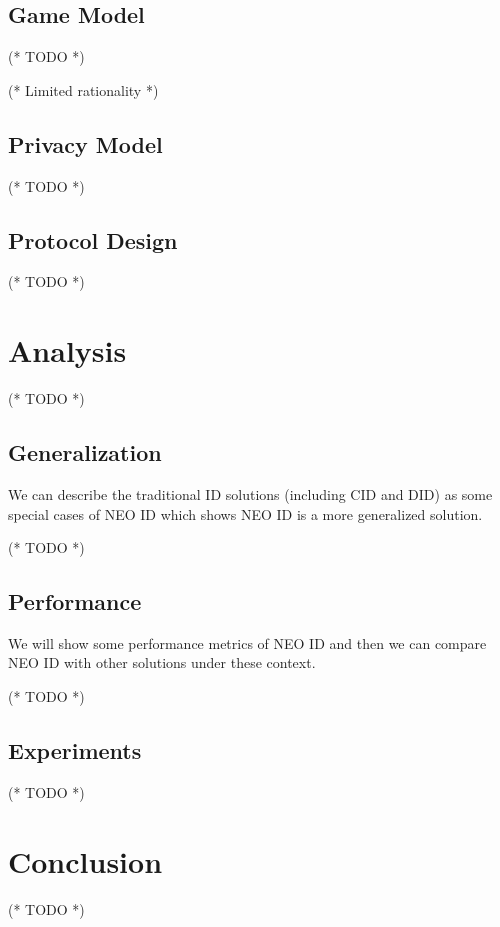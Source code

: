 \documentclass{article}
\begin{document}
\subsection{Game Model}



(* TODO *)



(* Limited rationality *)


\subsection{Privacy Model}



(* TODO *)


\subsection{Protocol Design}



(* TODO *)


\section{Analysis}



(* TODO *)


\subsection{Generalization}



We can describe the traditional ID solutions (including CID and DID) as some special cases of NEO ID which shows NEO ID is a more generalized solution.



(* TODO *)


\subsection{Performance}



We will show some performance metrics of NEO ID and then we can compare NEO ID with other solutions under these context.



(* TODO *)


\subsection{Experiments}



(* TODO *)


\section{Conclusion}



(* TODO *)
\end{document}
